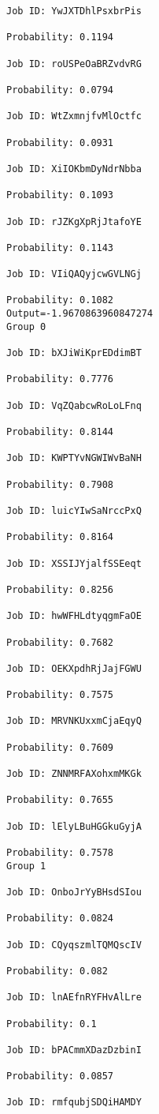 \documentclass[11pt]{article}
\begin{document}
\begin{Verbatim}[commandchars=\\\{\}]
Job ID: YwJXTDhlPsxbrPis

Probability: 0.1194

Job ID: roUSPeOaBRZvdvRG

Probability: 0.0794

Job ID: WtZxmnjfvMlOctfc

Probability: 0.0931

Job ID: XiIOKbmDyNdrNbba

Probability: 0.1093

Job ID: rJZKgXpRjJtafoYE

Probability: 0.1143

Job ID: VIiQAQyjcwGVLNGj

Probability: 0.1082
Output=-1.9670863960847274
Group 0

Job ID: bXJiWiKprEDdimBT

Probability: 0.7776

Job ID: VqZQabcwRoLoLFnq

Probability: 0.8144

Job ID: KWPTYvNGWIWvBaNH

Probability: 0.7908

Job ID: luicYIwSaNrccPxQ

Probability: 0.8164

Job ID: XSSIJYjalfSSEeqt

Probability: 0.8256

Job ID: hwWFHLdtyqgmFaOE

Probability: 0.7682

Job ID: OEKXpdhRjJajFGWU

Probability: 0.7575

Job ID: MRVNKUxxmCjaEqyQ

Probability: 0.7609

Job ID: ZNNMRFAXohxmMKGk

Probability: 0.7655

Job ID: lElyLBuHGGkuGyjA

Probability: 0.7578
Group 1

Job ID: OnboJrYyBHsdSIou

Probability: 0.0824

Job ID: CQyqszmlTQMQscIV

Probability: 0.082

Job ID: lnAEfnRYFHvAlLre

Probability: 0.1

Job ID: bPACmmXDazDzbinI

Probability: 0.0857

Job ID: rmfqubjSDQiHAMDY


\end{Verbatim}
\end{document}
